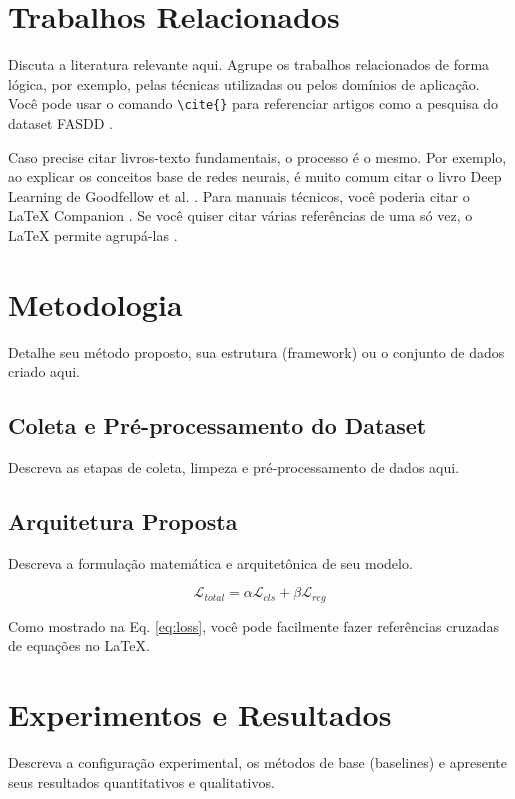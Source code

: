 \documentclass[10pt, twocolumn, a4paper]{article}
\begin{document}
\section{Trabalhos Relacionados}
Discuta a literatura relevante aqui. Agrupe os trabalhos relacionados de forma lógica, por exemplo, pelas técnicas utilizadas ou pelos domínios de aplicação. Você pode usar o comando \verb|\cite{}| para referenciar artigos como a pesquisa do dataset FASDD \cite{exemplo_ref}.

Caso precise citar livros-texto fundamentais, o processo é o mesmo. Por exemplo, ao explicar os conceitos base de redes neurais, é muito comum citar o livro Deep Learning de Goodfellow et al. \cite{goodfellow2016deep}. Para manuais técnicos, você poderia citar o LaTeX Companion \cite{latex_companion}. Se você quiser citar várias referências de uma só vez, o LaTeX permite agrupá-las \cite{exemplo_ref, goodfellow2016deep, latex_companion}.

\section{Metodologia}
Detalhe seu método proposto, sua estrutura (framework) ou o conjunto de dados criado aqui.

\subsection{Coleta e Pré-processamento do Dataset}
Descreva as etapas de coleta, limpeza e pré-processamento de dados aqui.

\subsection{Arquitetura Proposta}
Descreva a formulação matemática e arquitetônica de seu modelo. 

\begin{equation}
    \mathcal{L}_{total} = \alpha \mathcal{L}_{cls} + \beta \mathcal{L}_{reg} \label{eq:loss}
\end{equation}

Como mostrado na Eq. \ref{eq:loss}, você pode facilmente fazer referências cruzadas de equações no LaTeX.

\section{Experimentos e Resultados}
Descreva a configuração experimental, os métodos de base (baselines) e apresente seus resultados quantitativos e qualitativos.
\end{document}

